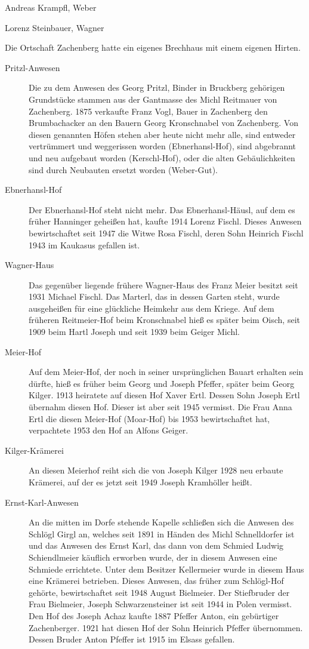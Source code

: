 \documentclass[12pt,a4pager]{book}
\begin{document}
Andreas Krampfl, Weber

Lorenz Steinbauer, Wagner

Die Ortschaft Zachenberg hatte ein eigenes Brechhaus mit einem eigenen Hirten.

\begin{description}
\item[Pritzl-Anwesen] Die zu dem Anwesen des Georg Pritzl, Binder in Bruckberg
gehörigen Grundstücke stammen aus der Gantmasse des Michl Reitmauer von
Zachenberg. 1875 verkaufte Franz Vogl, Bauer in Zachenberg den Brumbachacker an
den Bauern Georg Kronschnabel von Zachenberg. Von diesen genannten Höfen stehen
aber heute nicht mehr alle, sind entweder vertrümmert und weggerissen worden
(Ebnerhansl-Hof), sind abgebrannt und neu aufgebaut worden (Kerschl-Hof), oder
die alten Gebäulichkeiten sind durch Neubauten ersetzt worden (Weber-Gut).

\item[Ebnerhansl-Hof] Der Ebnerhansl-Hof steht nicht mehr. Das Ebnerhansl-Häusl,
auf dem es früher Hanninger geheißen hat, kaufte 1914 Lorenz Fischl. Dieses
Anwesen bewirtschaftet seit 1947 die Witwe Rosa Fischl, deren Sohn Heinrich
Fischl 1943 im Kaukasus gefallen ist.

\item[Wagner-Haus] Das gegenüber liegende frühere Wagner-Haus des Franz Meier
besitzt seit 1931 Michael Fischl. Das Marterl, das in dessen Garten steht, wurde
ausgeheißen für eine glückliche Heimkehr aus dem Kriege. Auf dem früheren
Reitmeier-Hof beim Kronschnabel hieß es später beim Oisch, seit 1909 beim Hartl
Joseph und seit 1939 beim Geiger Michl.

\item[Meier-Hof] Auf dem Meier-Hof, der noch in seiner ursprünglichen Bauart
erhalten sein dürfte, hieß es früher beim Georg und Joseph Pfeffer, später beim
Georg Kilger. 1913 heiratete auf diesen Hof Xaver Ertl. Dessen Sohn Joseph Ertl
übernahm diesen Hof. Dieser ist aber seit 1945 vermisst. Die Frau Anna Ertl die
diesen Meier-Hof (Moar-Hof) bis 1953 bewirtschaftet hat, verpachtete 1953 den
Hof an Alfons Geiger.

\item[Kilger-Krämerei] An diesen Meierhof reiht sich die von Joseph Kilger 1928
neu erbaute Krämerei, auf der es jetzt seit 1949 Joseph Kramhöller heißt.

\item[Ernst-Karl-Anwesen] An die mitten im Dorfe stehende Kapelle schließen sich
die Anwesen des Schlögl Girgl an, welches seit 1891 in Händen des Michl
Schnelldorfer ist und das Anwesen des Ernst Karl, das dann von dem Schmied
Ludwig Schiendlmeier käuflich erworben wurde, der in diesem Anwesen eine
Schmiede errichtete. Unter dem Besitzer Kellermeier wurde in diesem Haus eine
Krämerei betrieben. Dieses Anwesen, das früher zum Schlögl-Hof gehörte,
bewirtschaftet seit 1948 August Bielmeier. Der Stiefbruder der Frau Bielmeier,
Joseph Schwarzensteiner ist seit 1944 in Polen vermisst. Den Hof des Joseph
Achaz kaufte 1887 Pfeffer Anton, ein gebürtiger Zachenberger. 1921 hat diesen
Hof der Sohn Heinrich Pfeffer übernommen. Dessen Bruder Anton Pfeffer ist 1915
im Elsass gefallen.


\end{description}
\end{document}
